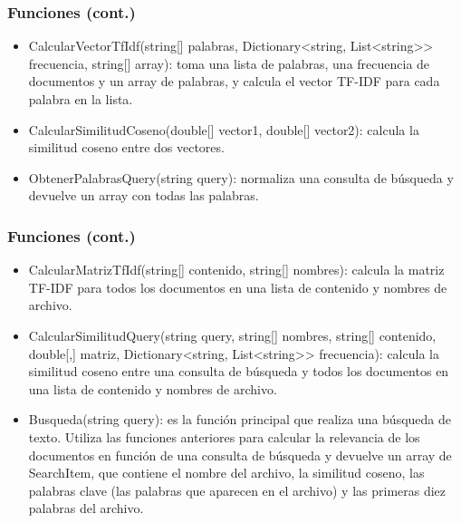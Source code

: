 \documentclass{beamer}
\begin{document}
\begin{frame}
\frametitle{Funciones (cont.)}
\begin{itemize}
\item CalcularVectorTfIdf(string[] palabras, Dictionary<string, List<string>> frecuencia, string[] array): toma una lista de palabras, una frecuencia de documentos y un array de palabras, y calcula el vector TF-IDF para cada palabra en la lista.
\item CalcularSimilitudCoseno(double[] vector1, double[] vector2): calcula la similitud coseno entre dos vectores.
\item ObtenerPalabrasQuery(string query): normaliza una consulta de búsqueda y devuelve un array con todas las palabras.
\end{itemize}
\end{frame}

\begin{frame}
\frametitle{Funciones (cont.)}
\begin{itemize}
\item CalcularMatrizTfIdf(string[] contenido, string[] nombres): calcula la matriz TF-IDF para todos los documentos en una lista de contenido y nombres de archivo.
\item CalcularSimilitudQuery(string query, string[] nombres, string[] contenido, double[,] matriz, Dictionary<string, List<string>> frecuencia): calcula la similitud coseno entre una consulta de búsqueda y todos los documentos en una lista de contenido y nombres de archivo.
\item Busqueda(string query): es la función principal que realiza una búsqueda de texto. Utiliza las funciones anteriores para calcular la relevancia de los documentos en función de una consulta de búsqueda y devuelve un array de SearchItem, que contiene el nombre del archivo, la similitud coseno, las palabras clave (las palabras que aparecen en el archivo) y las primeras diez palabras del archivo.
\end{itemize}
\end{frame}
\end{document}
